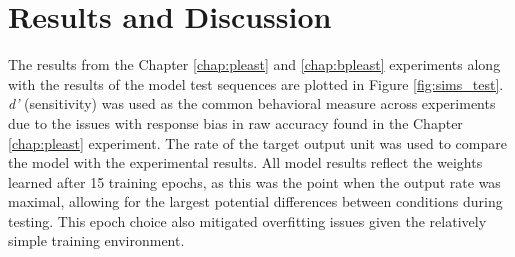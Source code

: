 \documentclass[dwyatte_dissertation.tex]{subfiles}
\begin{document}
\section{Results and Discussion}
The results from the Chapter \ref{chap:pleast} and \ref{chap:bpleast} experiments along with the results of the model test sequences are plotted in Figure \ref{fig:sims_test}. \textit{d'} (sensitivity) was used as the common behavioral measure across experiments due to the issues with response bias in raw accuracy found in the Chapter \ref{chap:pleast} experiment. The rate of the target output unit was used to compare the model with the experimental results. All model results reflect the weights learned after 15 training epochs, as this was the point when the output rate was maximal, allowing for the largest potential differences between conditions during testing. This epoch choice also mitigated overfitting issues given the relatively simple training environment.
\end{document}

